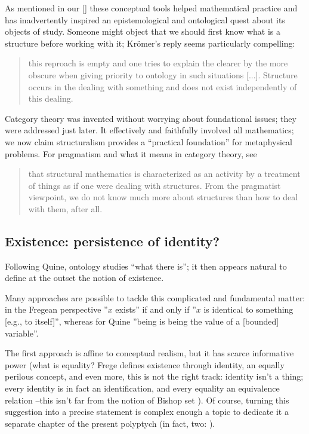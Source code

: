 As mentioned in our \autoref{} these conceptual tools helped mathematical practice and has inadvertently inspired an epistemological and ontological quest about its objects of study. Someone might object that we should first know what is a structure before working with it; Kr\"omer's reply seems particularly compelling:
\begin{quote}
	this reproach is empty and one tries to explain the clearer by the more obscure when giving priority to ontology in such situations [...]. Structure occurs in the dealing with something and does
	not exist independently of this dealing. \cite{kromer2007tool}
\end{quote}
Category theory was invented without worrying about foundational issues; they were addressed just later. It effectively and faithfully involved all mathematics; we now claim structuralism provides a ``practical foundation'' for metaphysical problems. For pragmatism and what it means in category theory, see
\begin{quote}
	that structural mathematics is characterized as an activity by a treatment of things as if one were dealing with structures. From the pragmatist viewpoint, we do not know much more about structures than how to deal with them, after all. \hfill \cite{kromer2007tool}
\end{quote}
\subsection{Existence: persistence of identity?} \label{existence}
Following Quine, ontology studies ``what there is''; it then appears natural to define at the outset the notion of existence.

Many approaches are possible to tackle this complicated and fundamental matter: in the Fregean perspective \cite{Frege} ''$x$ exists'' if and only if ''$x$ is identical to something [e.g., to itself]'', whereas for Quine \cite{Qui53} ''being is being the value of a [bounded] variable''.

The first approach is affine to conceptual realism, but it has scarce informative power (what is equality? Frege defines existence through identity, an equally perilous concept, and even more, this is not the right track: identity isn't a thing; every identity is in fact an identification, and every equality an equivalence relation --this isn't far from the notion of Bishop set \cite{}). Of course, turning this suggestion into a precise statement is complex enough a topic to dedicate it a separate chapter of the present polyptych (in fact, two: \cite{black,homot}).

